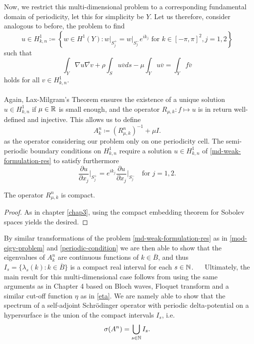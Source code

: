 Now, we restrict this multi-dimensional problem to a corresponding fundamental domain of periodicity, let this for simplicity be $Y$. Let us therefore, consider analogous to before, the problem to find 
	\[ u \in H^{1}_{k, n} \coloneqq \left\{ w \in H^{1}(Y) \colon w \big|_{S_{j}^{+}} = w \big|_{S_{j}^{-}} e^{i k_{j}} \text{ for } k \in [-\pi, \pi]^{2}, j = 1,2 \right\} \]
such that
	\begin{equation}
		\int_{Y} \nabla u \overline{\nabla v} + \rho \int_{S} u \overline{v} ds - \mu \int_{Y} u \overline{v} = \int_{Y} f \overline{v} \label{md-weak-formulation-res}
	\end{equation} 
holds for all $v \in H^{1}_{k, n}$. 
~\\ ~\\
Again, Lax-Milgram's Theorem ensures the existence of a unique solution $u \in H^{1}_{k, n}$ if $\mu \in \mathbb{R}$ is small enough, and the operator $R_{\mu, k} \colon f \mapsto u$ is in return well-defined and injective. This allows us to define  %
	\[ A_{k}^{n} \coloneqq \left(R_{\mu, k}^{n}\right)^{-1} + \mu I. \]
as the operator considering our problem only on one periodicity cell. The semi-periodic boundary conditions on $H^{1}_{k,n}$ require a solution $u \in H^{1}_{k, n}$ of \eqref{md-weak-formulation-res} to satisfy furthermore
	\[ \frac{\partial u}{\partial x_{j}}\big|_{S_{j}^{+}} = e^{ik_{j}} \frac{\partial u}{\partial x_{j}}\big|_{S_{j}^{-}} \quad \text{for } j = 1, 2.  \]
	
\begin{theorem}
	The operator $R_{\mu, k}^{n}$ is compact.	

	\begin{proof}
		As in chapter \ref{chap3}, using the compact embedding theorem for Sobolev spaces yields the desired. %
	\end{proof}
\end{theorem}

By similar transformations of the problem \eqref{md-weak-formulation-res} as in \eqref{mod-eigv-problem} and \eqref{periodic-condition} we are then able to show that the eigenvalues of $A^{n}_{k}$ are continuous functions of $k \in \overline{B}$, and thus $I_{s} = \{ \lambda_{s}(k) : k \in \overline{B} \}$ is a compact real interval for each $s \in \mathbb{N}$. %
~\newline ~\newline
Ultimately, the main result for this multi-dimensional case follows from using the same arguments as in Chapter 4 based on Bloch waves, Floquet transform and a similar cut-off function $\eta$ as in \eqref{eta}. We are namely able to show that the spectrum of a self-adjoint Schrödinger operator with periodic delta-potential on a hypersurface is the union of the  compact intervals $I_{s}$, i.e.
	\[ \sigma(A^{n}) = \bigcup_{s \in \mathbb{N}} I_{s}. \]